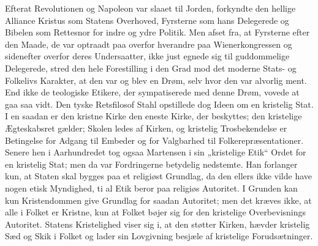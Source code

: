 \documentclass[12pt,a4paper,openany]{book}
\newcommand{\opage}[1]{\marginnote{\footnotesize\textit{[#1]}}}
\begin{document}
Efterat Revolutionen og Napoleon var slaaet til Jorden, forkyndte
den hellige Alliance Kristus som Statens Overhoved, Fyrsterne som
hans Delegerede og Bibelen som Rettesnor for indre og ydre Politik.
Men afset fra, at Fyrsterne efter den Maade, de var optraadt paa
overfor hverandre paa Wienerkongressen og sidenefter overfor deres
Undersaatter, ikke just egnede sig til guddommelige Delegerede, stred
\opage{143}den hele Forestilling i den Grad mod det moderne Stats- og Folkelivs
Karakter, at den var og blev en Drøm, selv hvor den var alvorlig
ment. End ikke de teologiske Etikere, der sympatiserede med
denne Drøm, vovede at gaa saa vidt. Den tyske Retsfilosof Stahl opstillede
dog Ideen om en kristelig Stat. I en saadan er den kristne
Kirke den eneste Kirke, der beskyttes; den kristelige Ægteskabsret
gælder; Skolen ledes af Kirken, og kristelig Trosbekendelse er Betingelse
for Adgang til Embeder og for Valgbarhed til Folkerepræsentationer.
Senere hen i Aarhundredet tog ogsaa Martensen i sin
„kristelige Etik“ Ordet for en kristelig Stat; men da var Fordringerne
betydelig nedstemte. Han forlanger kun, at Staten skal bygges
paa et religiøst Grundlag, da den ellers ikke vilde have nogen etisk
Myndighed, ti al Etik beror paa religiøs Autoritet. I Grunden kan
kun Kristendommen give Grundlag for saadan Autoritet; men det
kræves ikke, at alle i Folket er Kristne, kun at Folket bøjer sig for
den kristelige Overbevisnings Autoritet. Statens Kristelighed viser sig
i, at den støtter Kirken, hævder kristelig Sæd og Skik i Folket og
lader sin Lovgivning besjæle af kristelige Forudsætninger.
\end{document}
